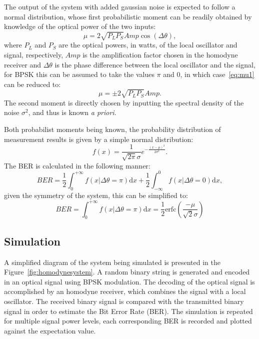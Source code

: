 The output of the system with added gaussian noise is expected to follow a normal distribution, whose first probabilistic moment can be readily obtained by knowledge of the optical power of the two inputs:
\begin{equation}\label{eq:mu1}
\mu=2\sqrt{P_LP_S}Amp\cos(\Delta\theta),
\end{equation}
where $P_L$ and $P_S$ are the optical powers, in watts, of the local oscillator and signal, respectively, $Amp$ is the amplification factor chosen in the homodyne receiver and $\Delta\theta$ is the phase difference between the local oscillator and the signal, for BPSK this can be assumed to take the values $\pi$ and 0, in which case~\eqref{eq:mu1} can be reduced to:
\begin{equation}
\mu=\pm2\sqrt{P_LP_S}Amp.
\end{equation}
The second moment is directly chosen by inputting the spectral density of the noise $\sigma^2$, and thus is known \textit{a priori}.
\par
Both probabilist moments being known, the probability distribution of measurement results is given by a simple normal distribution:
\begin{equation}
f(x)=\frac{1}{\sqrt{2\pi}\sigma}e^{-\frac{(x-\mu)^2}{2\sigma^2}}.
\end{equation}
The BER is calculated in the following manner:
\begin{equation}
BER=\frac{1}{2}\int_0^{+\infty}f(x|\Delta\theta=\pi)\text{d}x+\frac{1}{2}\int^0_{-\infty}f(x|\Delta\theta=0)\text{d}x,
\end{equation}
given the symmetry of the system, this can be simplified to:
\begin{equation}\label{eq:BERtheoretical}
BER=\int_0^{+\infty}f(x|\Delta\theta=\pi)\text{d}x=\frac{1}{2}\text{erfc}\left(\frac{-\mu}{\sqrt{2}\sigma}\right)
\end{equation}

\subsection{Simulation}

A simplified diagram of the system being simulated is presented in the Figure~\ref{fig:homodynesystem}. A random binary string is generated and encoded in an optical signal using BPSK modulation. The decoding of the optical signal is accomplished by an homodyne receiver, which combines the signal with a local oscillator. The received binary signal is compared with the transmitted binary signal in order to estimate the Bit Error Rate (BER). The simulation is repeated for multiple signal power levels, each corresponding BER is recorded and plotted against the expectation value.

